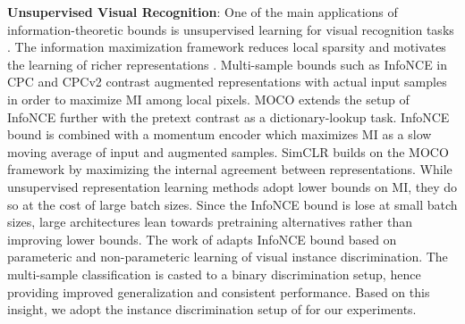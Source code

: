 \documentclass{article}
\begin{document}
\textbf{Unsupervised Visual Recognition}: One of the main applications of information-theoretic bounds is unsupervised learning for visual recognition tasks \cite{visual}. The information maximization framework \cite{infomax} reduces local sparsity and motivates the learning of richer representations \cite{cpc}. Multi-sample bounds such as InfoNCE in CPC \cite{cpc} and CPCv2 \cite{cpcv2} contrast augmented representations with actual input samples in order to maximize MI among local pixels. MOCO \cite{moco,mocov2} extends the setup of InfoNCE further with the pretext contrast as a dictionary-lookup task. InfoNCE bound is combined with a momentum encoder which maximizes MI as a slow moving average of input and augmented samples. SimCLR \cite{simclr} builds on the MOCO framework by maximizing the internal agreement between representations. While unsupervised representation learning methods adopt lower bounds on MI, they do so at the cost of large batch sizes. Since the InfoNCE bound is lose at small batch sizes, large architectures lean towards pretraining alternatives \cite{simclrv2} rather than improving lower bounds. The work of \cite{visual} adapts InfoNCE bound based on parameteric and non-parameteric learning of visual instance discrimination. The multi-sample classification is casted to a binary discrimination setup, hence providing improved generalization and consistent performance. Based on this insight, we adopt the instance discrimination setup of \cite{visual} for our experiments. 
\end{document}
